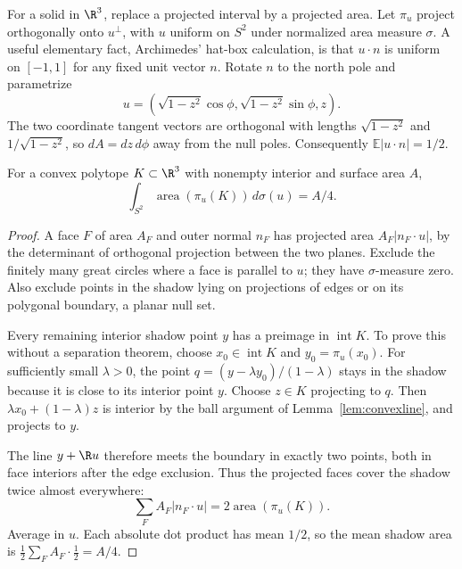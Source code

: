 For a solid in $\R^3$, replace a projected interval by a projected area. Let $\pi_u$ project orthogonally onto $u^\perp$, with $u$ uniform on $S^2$ under normalized area measure $\sigma$. A useful elementary fact, Archimedes' hat-box calculation, is that $u\cdot n$ is uniform on $[-1,1]$ for any fixed unit vector $n$. Rotate $n$ to the north pole and parametrize
\[
u=(\sqrt{1-z^2}\cos\phi,\sqrt{1-z^2}\sin\phi,z).
\]
The two coordinate tangent vectors are orthogonal with lengths $\sqrt{1-z^2}$ and $1/\sqrt{1-z^2}$, so $dA=dz\,d\phi$ away from the null poles. Consequently $\mathbb E|u\cdot n|=1/2$.

\begin{theorem}\label{thm:cauchyspace}
For a convex polytope $K\subset\R^3$ with nonempty interior and surface area $A$,
\[
\int_{S^2}\operatorname{area}(\pi_u(K))\,d\sigma(u)=A/4.
\]
\end{theorem}

\begin{proof}
A face $F$ of area $A_F$ and outer normal $n_F$ has projected area $A_F|n_F\cdot u|$, by the determinant of orthogonal projection between the two planes. Exclude the finitely many great circles where a face is parallel to $u$; they have $\sigma$-measure zero. Also exclude points in the shadow lying on projections of edges or on its polygonal boundary, a planar null set.

Every remaining interior shadow point $y$ has a preimage in $\operatorname{int}K$. To prove this without a separation theorem, choose $x_0\in\operatorname{int}K$ and $y_0=\pi_u(x_0)$. For sufficiently small $\lambda>0$, the point $q=(y-\lambda y_0)/(1-\lambda)$ stays in the shadow because it is close to its interior point $y$. Choose $z\in K$ projecting to $q$. Then $\lambda x_0+(1-\lambda)z$ is interior by the ball argument of Lemma~\ref{lem:convexline}, and projects to $y$.

The line $y+\R u$ therefore meets the boundary in exactly two points, both in face interiors after the edge exclusion. Thus the projected faces cover the shadow twice almost everywhere:
\[
\sum_F A_F|n_F\cdot u|=2\operatorname{area}(\pi_u(K)).
\]
Average in $u$. Each absolute dot product has mean $1/2$, so the mean shadow area is $\tfrac12\sum_F A_F\cdot\tfrac12=A/4$.
\end{proof}

